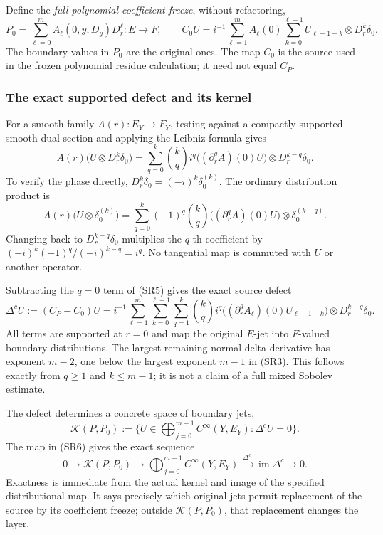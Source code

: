 \documentclass[
  11pt,
]{article}
\begin{document}
Define the \emph{full-polynomial coefficient freeze}, without
refactoring, \[
P_0=\sum_{\ell=0}^{m}A_\ell(0,y,D_y)D_r^\ell:E\to F,
\qquad
C_0U=i^{-1}\sum_{\ell=1}^{m}
 A_\ell(0)\sum_{k=0}^{\ell-1}
 U_{\ell-1-k}\otimes D_r^k\delta_0.
\tag{SR4}
\] The boundary values in \(P_0\) are the original ones. The map \(C_0\)
is the source used in the frozen polynomial residue calculation; it need
not equal \(C_P\).

\subsubsection{The exact supported defect and its
kernel}\label{the-exact-supported-defect-and-its-kernel}

For a smooth family \(A(r):E_Y\to F_Y\), testing against a compactly
supported smooth dual section and applying the Leibniz formula gives \[
A(r)\bigl(U\otimes D_r^k\delta_0\bigr)
=\sum_{q=0}^{k}\binom{k}{q}i^q
  \bigl((\partial_r^qA)(0)U\bigr)\otimes
  D_r^{k-q}\delta_0.
\tag{SR5}
\] To verify the phase directly, \(D_r^k\delta_0=(-i)^k\delta_0^{(k)}\).
The ordinary distribution product is \[
A(r)\bigl(U\otimes\delta_0^{(k)}\bigr)
=\sum_{q=0}^k(-1)^q\binom{k}{q}
 \bigl((\partial_r^qA)(0)U\bigr)\otimes\delta_0^{(k-q)}.
\] Changing back to \(D_r^{k-q}\delta_0\) multiplies the \(q\)-th
coefficient by \((-i)^k(-1)^q/(-i)^{k-q}=i^q\). No tangential map is
commuted with \(U\) or another operator.

Subtracting the \(q=0\) term of (SR5) gives the exact source defect \[
\boxed{\displaystyle
\Delta^c U:=(C_P-C_0)U
=i^{-1}\sum_{\ell=1}^{m}
 \sum_{k=0}^{\ell-1}\sum_{q=1}^{k}
 \binom{k}{q}i^q
 \bigl((\partial_r^qA_\ell)(0)U_{\ell-1-k}\bigr)
 \otimes D_r^{k-q}\delta_0.}
\tag{SR6}
\] All terms are supported at \(r=0\) and map the original \(E\)-jet
into \(F\)-valued boundary distributions. The largest remaining normal
delta derivative has exponent \(m-2\), one below the largest exponent
\(m-1\) in (SR3). This follows exactly from \(q\geq1\) and
\(k\leq m-1\); it is not a claim of a full mixed Sobolev estimate.

The defect determines a concrete space of boundary jets, \[
\mathcal K(P,P_0):=\{U\in\bigoplus_{j=0}^{m-1}C^\infty(Y,E_Y):
                 \Delta^cU=0\}.
\tag{SR7}
\] The map in (SR6) gives the exact sequence \[
0\longrightarrow\mathcal K(P,P_0)
\longrightarrow\bigoplus_{j=0}^{m-1}C^\infty(Y,E_Y)
\xrightarrow{\ \Delta^c\ }\operatorname{im}\Delta^c
\longrightarrow0.
\tag{SR8}
\] Exactness is immediate from the actual kernel and image of the
specified distributional map. It says precisely which original jets
permit replacement of the source by its coefficient freeze; outside
\(\mathcal K(P,P_0)\), that replacement changes the layer.
\end{document}
